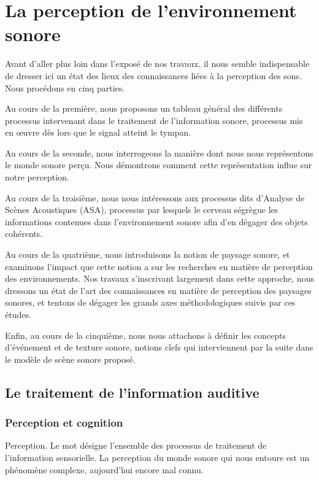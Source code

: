 \chapter{La perception de l'environnement sonore}\label{ch:psycho_ea}


Avant d'aller plus loin dans l'exposé de nos travaux, il nous semble indispensable de dresser ici un état des lieux des connaissances liées à la perception des sons. Nous procédons en cinq parties. 

Au cours de la première, nous proposons un tableau général des différents processus intervenant dans le traitement de l'information sonore, processus mis en œuvre dès lors que le signal atteint le tympan. 

Au cours de la seconde, nous interrogeons la manière dont nous nous représentons le monde sonore perçu. Nous démontrons comment cette représentation influe sur notre perception. 

Au cours de la troisième, nous nous intéressons aux processus dits d'Analyse de Scènes Acoustiques (ASA), processus par lesquels le cerveau ségrègue les informations contenues dans l'environnement sonore afin d'en dégager des objets cohérents. 

Au cours de la quatrième, nous introduisons la notion de paysage sonore, et examinons l'impact que cette notion a sur les recherches en matière de perception des environnements. Nos travaux s'inscrivant largement dans cette approche, nous dressons un état de l'art des connaissances en matière de perception des paysages sonores, et tentons de dégager les grands axes méthodologiques suivis par ces études.

Enfin, au cours de la cinquième, nous nous attachons à définir les concepts d'événement et de texture sonore, notions clefs qui interviennent par la suite dans le modèle de scène sonore proposé.

\section{Le traitement de l'information auditive}

\subsection{Perception et cognition}

Perception. Le mot désigne l'ensemble des processus de traitement de l'information sensorielle. 
La perception du monde sonore qui nous entoure est un phénomène complexe, aujourd'hui encore mal connu. 

